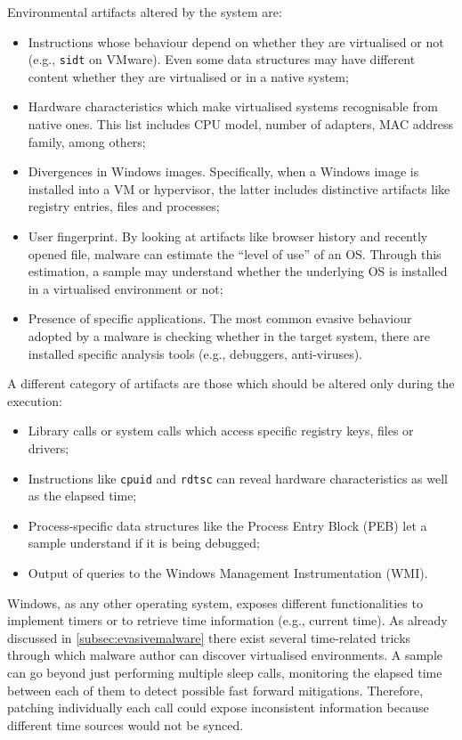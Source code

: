 \documentclass[LaM,binding=0.6cm]{sapthesis}
\begin{document}
\clearpage
\noindent
Environmental artifacts altered by the system are:
\begin{itemize}
\item Instructions whose behaviour depend on whether they are virtualised or not (e.g., \texttt{sidt} on VMware). Even some data structures may have different content whether they are virtualised or in a native system;
\item Hardware characteristics which make virtualised systems recognisable from native ones. This list includes CPU model, number of adapters, MAC address family, among others;
\item Divergences in Windows images. Specifically, when a Windows image is installed into a VM or hypervisor, the latter includes distinctive artifacts like registry entries, files and processes;
\item User fingerprint. By looking at artifacts like browser history and recently opened file, malware can estimate the ``level of use'' of an OS. Through this estimation, a sample may understand whether the underlying OS is installed in a virtualised environment or not;
\item Presence of specific applications. The most common evasive behaviour adopted by a malware is checking whether in the target system, there are installed specific analysis tools (e.g., debuggers, anti-viruses).
\end{itemize} 
A different category of artifacts are those which should be altered only during the execution:
\begin{itemize}
\item Library calls or system calls which access specific registry keys, files or drivers;
\item Instructions like \texttt{cpuid} and \texttt{rdtsc} can reveal hardware characteristics as well as the elapsed time;
\item Process-specific data structures like the Process Entry Block (PEB) let a sample understand if it is being debugged;
\item Output of queries to the Windows Management Instrumentation (WMI).
\end{itemize}
Windows, as any other operating system, exposes different functionalities to implement timers or to retrieve time information (e.g., current time). As already discussed in \autoref{subsec:evasivemalware} there exist several time-related tricks through which malware author can discover virtualised environments. A sample can go beyond just performing multiple sleep calls, monitoring the elapsed time between each of them to detect possible fast forward mitigations. Therefore, patching individually each call could expose inconsistent information because different time sources would not be synced.
\end{document}

